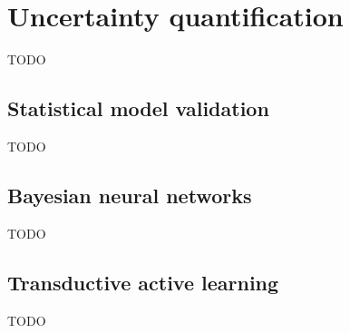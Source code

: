 \section{Uncertainty quantification}

TODO

\subsection{Statistical model validation}

TODO

\subsection{Bayesian neural networks}

TODO

\subsection{Transductive active learning}

TODO
